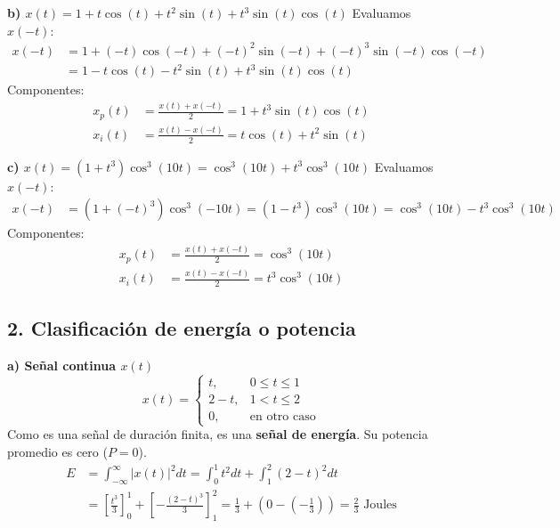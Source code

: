 \documentclass[12pt]{article}
\begin{document}
\textbf{b) $x(t) = 1 + t\cos(t) + t^2\sin(t) + t^3\sin(t)\cos(t)$}
Evaluamos $x(-t)$:
\begin{align*}
    x(-t) &= 1 + (-t)\cos(-t) + (-t)^2\sin(-t) + (-t)^3\sin(-t)\cos(-t) \\
          &= 1 - t\cos(t) - t^2\sin(t) + t^3\sin(t)\cos(t)
\end{align*}
Componentes:
\begin{align*}
    x_p(t) &= \frac{x(t) + x(-t)}{2} = 1 + t^3\sin(t)\cos(t) \\
    x_i(t) &= \frac{x(t) - x(-t)}{2} = t\cos(t) + t^2\sin(t)
\end{align*}

\textbf{c) $x(t) = (1 + t^3)\cos^3(10t) = \cos^3(10t) + t^3\cos^3(10t)$}
Evaluamos $x(-t)$:
\begin{align*}
    x(-t) &= (1 + (-t)^3)\cos^3(-10t) = (1 - t^3)\cos^3(10t) = \cos^3(10t) - t^3\cos^3(10t)
\end{align*}
Componentes:
\begin{align*}
    x_p(t) &= \frac{x(t) + x(-t)}{2} = \cos^3(10t) \\
    x_i(t) &= \frac{x(t) - x(-t)}{2} = t^3\cos^3(10t)
\end{align*}

\subsection*{2. Clasificación de energía o potencia}

\textbf{a) Señal continua $x(t)$}
\begin{equation*}
x(t) = \begin{cases} t, & 0 \le t \le 1 \\ 2-t, & 1 < t \le 2 \\ 0, & \text{en otro caso} \end{cases}
\end{equation*}
Como es una señal de duración finita, es una \textbf{señal de energía}. Su potencia promedio es cero ($P = 0$).
\begin{align*}
    E &= \int_{-\infty}^{\infty} |x(t)|^2 dt = \int_{0}^{1} t^2 dt + \int_{1}^{2} (2-t)^2 dt \\
      &= \left[ \frac{t^3}{3} \right]_0^1 + \left[ -\frac{(2-t)^3}{3} \right]_1^2 = \frac{1}{3} + \left(0 - \left(-\frac{1}{3}\right)\right) = \frac{2}{3} \text{ Joules}
\end{align*}
\end{document}
